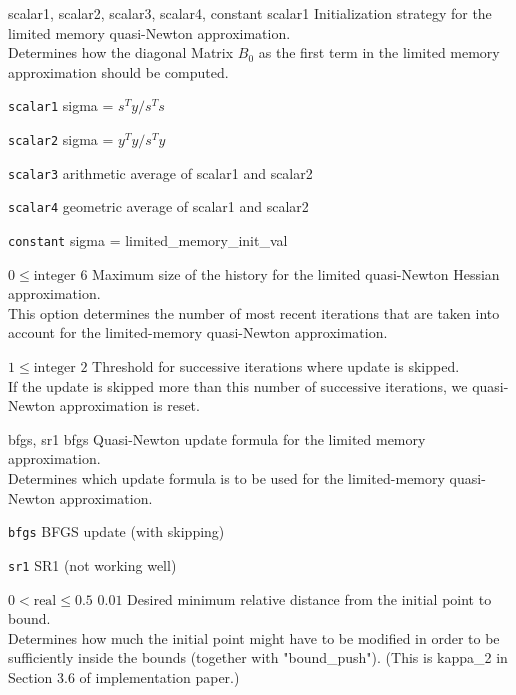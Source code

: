 %
{\ttfamily scalar1, scalar2, scalar3, scalar4, constant}%
{scalar1}%
{Initialization strategy for the limited memory quasi-Newton approximation.\\
Determines how the diagonal Matrix $B_0$ as the first term in the limited memory approximation should be computed.}%
{\begin{list}{}{
\setlength{\parsep}{0em}
\setlength{\leftmargin}{5ex}
\setlength{\labelwidth}{2ex}
\setlength{\itemindent}{0ex}
\setlength{\topsep}{0pt}}
\item[\texttt{scalar1}] sigma = $s^Ty/s^Ts$
\item[\texttt{scalar2}] sigma = $y^Ty/s^Ty$
\item[\texttt{scalar3}] arithmetic average of scalar1 and scalar2
\item[\texttt{scalar4}] geometric average of scalar1 and scalar2
\item[\texttt{constant}] sigma = limited\_memory\_init\_val
\end{list}
}

%
{$0\leq\textrm{integer}$}%
{$6$}%
{Maximum size of the history for the limited quasi-Newton Hessian approximation.\\
This option determines the number of most recent iterations that are taken into account for the limited-memory quasi-Newton approximation.}%
{}

%
{$1\leq\textrm{integer}$}%
{$2$}%
{Threshold for successive iterations where update is skipped.\\
If the update is skipped more than this number of successive iterations, we quasi-Newton approximation is reset.}%
{}

%
{\ttfamily bfgs, sr1}%
{bfgs}%
{Quasi-Newton update formula for the limited memory approximation.\\
Determines which update formula is to be used for the limited-memory quasi-Newton approximation.}%
{\begin{list}{}{
\setlength{\parsep}{0em}
\setlength{\leftmargin}{5ex}
\setlength{\labelwidth}{2ex}
\setlength{\itemindent}{0ex}
\setlength{\topsep}{0pt}}
\item[\texttt{bfgs}] BFGS update (with skipping)
\item[\texttt{sr1}] SR1 (not working well)
\end{list}
}

%
{$0<\textrm{real}\leq0.5$}%
{$0.01$}%
{Desired minimum relative distance from the initial point to bound.\\
Determines how much the initial point might have to be modified in order to be sufficiently inside the bounds (together with "bound\_push").  (This is kappa\_2 in Section 3.6 of implementation paper.)}%
{}

